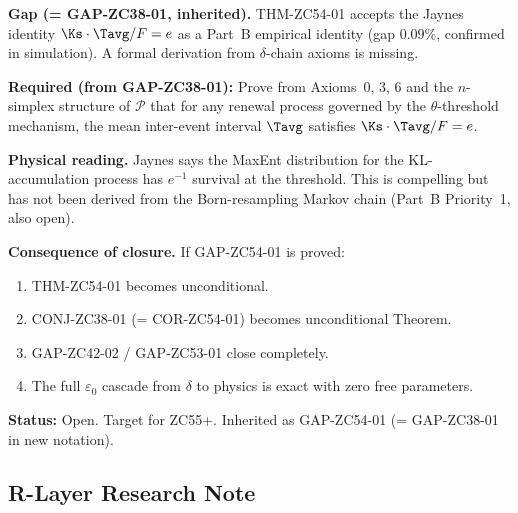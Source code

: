 \documentclass[12pt, a4paper]{article}
\begin{document}
\begin{openqbox}[title={GAP-ZC54-01: Jaynes K20 from Axioms
  (Inherited, Open)}]
\textbf{Gap (= GAP-ZC38-01, inherited).}
THM-ZC54-01 accepts the Jaynes identity
$\Ks\cdot\Tavg/F = e$ as a Part~B empirical identity
(gap $0.09\%$, confirmed in simulation).
A formal derivation from $\delta$-chain axioms is missing.

\textbf{Required (from GAP-ZC38-01):}
Prove from Axioms~0, 3, 6 and the $n$-simplex structure of
$\mathcal{P}$ that for any renewal process governed by the
$\theta$-threshold mechanism, the mean inter-event interval
$\Tavg$ satisfies $\Ks\cdot\Tavg/F = e$.

\textbf{Physical reading.}
Jaynes says the MaxEnt distribution for the KL-accumulation
process has $e^{-1}$ survival at the threshold.
This is compelling but has not been derived from the
Born-resampling Markov chain (Part~B Priority~1, also open).

\textbf{Consequence of closure.}
If GAP-ZC54-01 is proved:
\begin{enumerate}[leftmargin=2em, noitemsep]
\item THM-ZC54-01 becomes unconditional.
\item CONJ-ZC38-01 (= COR-ZC54-01) becomes unconditional Theorem.
\item GAP-ZC42-02 / GAP-ZC53-01 close completely.
\item The full $\varepsilon_0$ cascade from $\delta$ to physics is
  exact with zero free parameters.
\end{enumerate}

\textbf{Status:} Open. Target for ZC55+. Inherited as
GAP-ZC54-01 (= GAP-ZC38-01 in new notation).
\end{openqbox}

\subsection{R-Layer Research Note}
\end{document}

